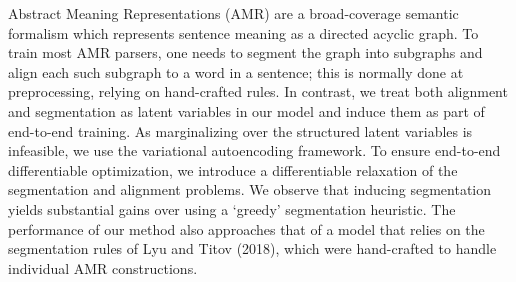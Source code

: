 Abstract Meaning Representations (AMR) are a broad-coverage semantic formalism which represents sentence meaning as a directed acyclic graph. To train most AMR parsers, one needs to segment the graph into subgraphs and align each such subgraph to a word in a sentence; this is normally done at preprocessing, relying on hand-crafted rules. In contrast, we treat both alignment and segmentation as latent variables in our model and induce them as part of end-to-end training.  As marginalizing over the structured latent variables is infeasible, we use the variational autoencoding framework.   To ensure end-to-end differentiable optimization, we introduce a differentiable relaxation of the segmentation and alignment problems. We observe that inducing segmentation yields substantial gains over using a `greedy' segmentation heuristic. The performance of our method also approaches that of a model that relies on the segmentation rules of Lyu and Titov (2018), which were hand-crafted to handle individual AMR constructions.

